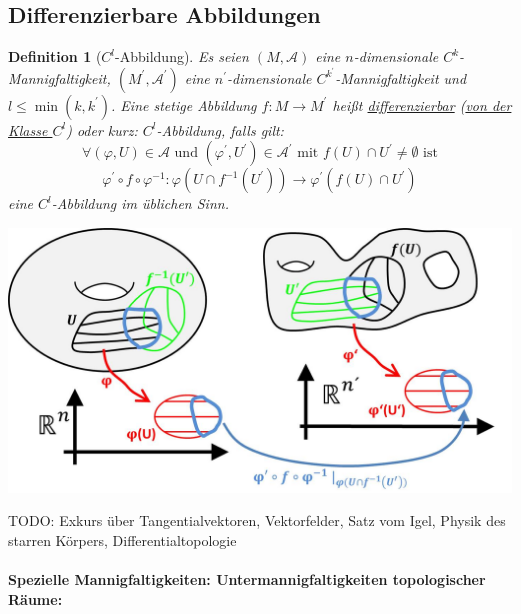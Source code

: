 \documentclass[a4paper,11pt,notitlepage]{report}
\newtheorem{definition}{Definition}[chapter]
\begin{document}
\subsection{Differenzierbare Abbildungen}
\begin{definition}[$C^l$-Abbildung]
Es seien $(M, \mathcal{A})$ eine $n$-dimensionale $C^k$-Mannigfaltigkeit, $(M^\prime, \mathcal{A}^\prime)$ eine $n^\prime$-dimensionale $C^{k^\prime}$-Mannigfaltigkeit und $l \leq \min(k,k^\prime)$. Eine stetige Abbildung $f \colon M \rightarrow M^\prime$ heißt \underline{differenzierbar} (\underline{von der Klasse $C^l$}) oder kurz: $C^l$-Abbildung, falls gilt:
$$\forall (\varphi,U) \in \mathcal{A} \text{ und } (\varphi^\prime, U^\prime) \in \mathcal{A}^\prime \text{ mit } f(U) \cap U^\prime \neq \emptyset \text{ ist}$$
$$\boxed{\varphi^\prime \circ f \circ \varphi^{-1} \colon \varphi(U \cap f^{-1}(U^\prime)) \rightarrow \varphi^\prime(f(U)\cap U^\prime)}$$
eine $C^l$-Abbildung im üblichen Sinn.
\end{definition}
\begin{center}
	\includegraphics[scale=0.5]{images/Abb_diffbar.jpg}
\end{center}

TODO: Exkurs über Tangentialvektoren, Vektorfelder, Satz vom Igel, Physik des starren Körpers, Differentialtopologie

\newpage 
\paragraph{
Spezielle Mannigfaltigkeiten: Untermannigfaltigkeiten topologischer Räume: }
 
\end{document}
